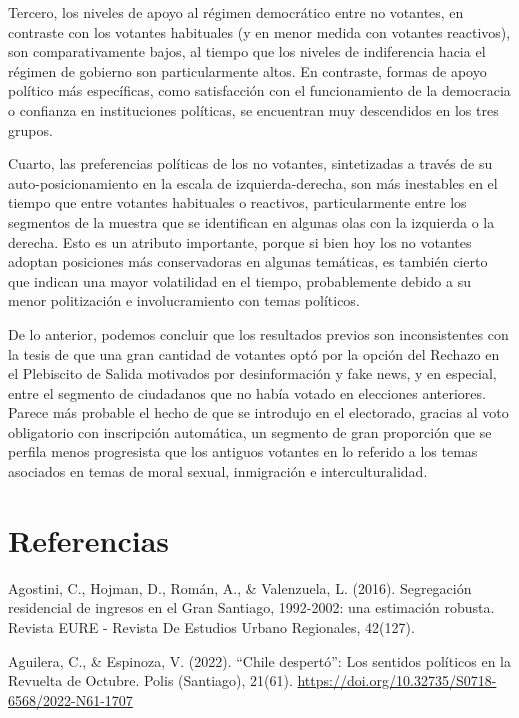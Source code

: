 \documentclass[
  12pt,
]{book}
\begin{document}
Tercero, los niveles de apoyo al régimen democrático entre no votantes, en contraste con los votantes habituales (y en menor medida con votantes reactivos), son comparativamente bajos, al tiempo que los niveles de indiferencia hacia el régimen de gobierno son particularmente altos. En contraste, formas de apoyo político más específicas, como satisfacción con el funcionamiento de la democracia o confianza en instituciones políticas, se encuentran muy descendidos en los tres grupos.

Cuarto, las preferencias políticas de los no votantes, sintetizadas a través de su auto-posicionamiento en la escala de izquierda-derecha, son más inestables en el tiempo que entre votantes habituales o reactivos, particularmente entre los segmentos de la muestra que se identifican en algunas olas con la izquierda o la derecha. Esto es un atributo importante, porque si bien hoy los no votantes adoptan posiciones más conservadoras en algunas temáticas, es también cierto que indican una mayor volatilidad en el tiempo, probablemente debido a su menor politización e involucramiento con temas políticos.

De lo anterior, podemos concluir que los resultados previos son inconsistentes con la tesis de que una gran cantidad de votantes optó por la opción del Rechazo en el Plebiscito de Salida motivados por desinformación y fake news, y en especial, entre el segmento de ciudadanos que no había votado en elecciones anteriores. Parece más probable el hecho de que se introdujo en el electorado, gracias al voto obligatorio con inscripción automática, un segmento de gran proporción que se perfila menos progresista que los antiguos votantes en lo referido a los temas asociados en temas de moral sexual, inmigración e interculturalidad.

\hypertarget{referencias}{%
\chapter*{Referencias}\label{referencias}}

Agostini, C., Hojman, D., Román, A., \& Valenzuela, L. (2016). Segregación residencial de ingresos en el Gran Santiago, 1992-2002: una estimación robusta. Revista EURE - Revista De Estudios Urbano Regionales, 42(127).

Aguilera, C., \& Espinoza, V. (2022). ``Chile despertó'': Los sentidos políticos en la Revuelta de Octubre. Polis (Santiago), 21(61). \url{https://doi.org/10.32735/S0718-6568/2022-N61-1707}
\end{document}

